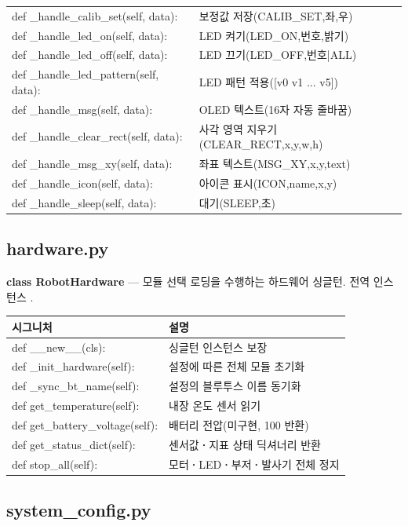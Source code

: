 \begin{longtable}{S{7.8cm} L{6.2cm}}
def \_handle\_calib\_set(self, data): & 보정값 저장(CALIB\_SET,좌,우) \\
def \_handle\_led\_on(self, data): & LED 켜기(LED\_ON,번호,밝기) \\
def \_handle\_led\_off(self, data): & LED 끄기(LED\_OFF,번호|ALL) \\
def \_handle\_led\_pattern(self, data): & LED 패턴 적용([v0 v1 ... v5]) \\
def \_handle\_msg(self, data): & OLED 텍스트(16자 자동 줄바꿈) \\
def \_handle\_clear\_rect(self, data): & 사각 영역 지우기(CLEAR\_RECT,x,y,w,h) \\
def \_handle\_msg\_xy(self, data): & 좌표 텍스트(MSG\_XY,x,y,text) \\
def \_handle\_icon(self, data): & 아이콘 표시(ICON,name,x,y) \\
def \_handle\_sleep(self, data): & 대기(SLEEP,초) \\
\bottomrule
\end{longtable}

\subsection{hardware.py}

\noindent\textbf{class RobotHardware} --- 모듈 선택 로딩을 수행하는 하드웨어 싱글턴.
전역 인스턴스 .

\begin{longtable}{S{7.4cm} L{6.6cm}}
\toprule
{}\normalfont\sffamily\bfseries 시그니처 & \normalfont\sffamily\bfseries 설명 \\
\midrule
\endhead
def \_\_new\_\_(cls): & 싱글턴 인스턴스 보장 \\
def \_init\_hardware(self): & 설정에 따른 전체 모듈 초기화 \\
def \_sync\_bt\_name(self): & 설정의 블루투스 이름 동기화 \\
def get\_temperature(self): & 내장 온도 센서 읽기 \\
def get\_battery\_voltage(self): & 배터리 전압(미구현, 100 반환) \\
def get\_status\_dict(self): & 센서값\textbf{·}지표 상태 딕셔너리 반환 \\
def stop\_all(self): & 모터\textbf{·}LED\textbf{·}부저\textbf{·}발사기 전체 정지 \\
\bottomrule
\end{longtable}

\subsection{system\_config.py}

